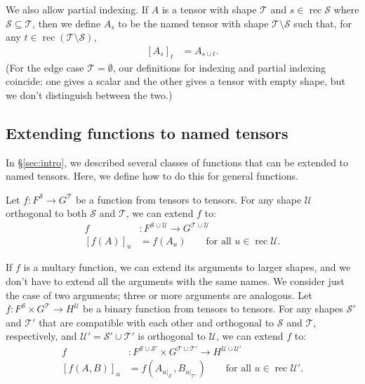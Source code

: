 \documentclass{article}
\DeclareMathOperator{\rec}{rec}
\newcommand{\restrict}[2]{\left.#1\right|_{#2}}
\begin{document}
We also allow partial indexing. If $A$ is a tensor with shape $\mathcal{T}$ and $s \in \rec \mathcal{S}$ where $\mathcal{S} \subseteq \mathcal{T}$, then we define $A_s$ to be the named tensor with shape $\mathcal{T} \setminus \mathcal{S}$ such that, for any $t \in \rec (\mathcal{T} \setminus \mathcal{S})$,
\begin{align*}
\left[A_s\right]_t &= A_{s \cup t}.
\end{align*}
(For the edge case $\mathcal{T} = \emptyset$, our definitions for indexing and partial indexing coincide: one gives a scalar and the other gives a tensor with empty shape, but we don't distinguish between the two.)

\subsection{Extending functions to named tensors}
\label{sec:tensorfunctions}

In \S\ref{sec:intro}, we described several classes of functions that can be extended to named tensors. Here, we define how to do this for general functions.

Let $f \colon F^{\mathcal{S}} \rightarrow G^{\mathcal{T}}$ be a function from tensors to tensors. For any shape $\mathcal{U}$ orthogonal to both $\mathcal{S}$ and $\mathcal{T}$, we can extend $f$ to:
\begin{align*}
f &: F^{\mathcal{S} \cup \mathcal{U}} \rightarrow G^{\mathcal{T} \cup \mathcal{U}} \\
[f(A)]_u &= f(A_u) \qquad \text{for all $u \in \rec\mathcal{U}$.}
\end{align*}

If $f$ is a multary function, we can extend its arguments to larger shapes, and we don't have to extend all the arguments with the same names. We consider just the case of two arguments; three or more arguments are analogous. Let $f \colon F^{\mathcal{S}} \times G^{\mathcal{T}} \rightarrow H^{\mathcal{U}}$ be a binary function from tensors to tensors. For any shapes $\mathcal{S'}$ and $\mathcal{T'}$ that are compatible with each other and orthogonal to $\mathcal{S}$ and $\mathcal{T}$, respectively, and $\mathcal{U'} = \mathcal{S'} \cup \mathcal{T'}$ is orthogonal to $\mathcal{U}$, we can extend $f$ to:
\begin{align*}
f &: F^{\mathcal{S} \cup \mathcal{S'}} \times G^{\mathcal{T} \cup \mathcal{T'}} \rightarrow H^{\mathcal{U} \cup \mathcal{U'}} \\
  [f(A,B)]_u &= f\left(A_{\restrict{u}{\mathcal{S'}}},B_{\restrict{u}{\mathcal{T'}}}\right) \qquad \text{for all $u \in \rec\mathcal{U'}$.}
\end{align*}
\end{document}

